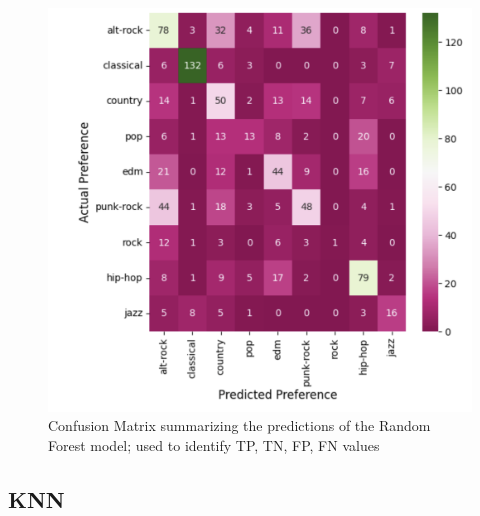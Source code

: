 \documentclass[times, twocolumn]{article}
\begin{document}
\begin{figure}[H]
    \centering
    \includegraphics[width=1.0\linewidth]{RFconf_mat.png}
    \caption{Confusion Matrix summarizing the predictions of the Random Forest model; used to identify TP, TN, FP, FN values}
    \label{rf_confmatrix}
\end{figure}

\subsection{KNN}
\end{document}
